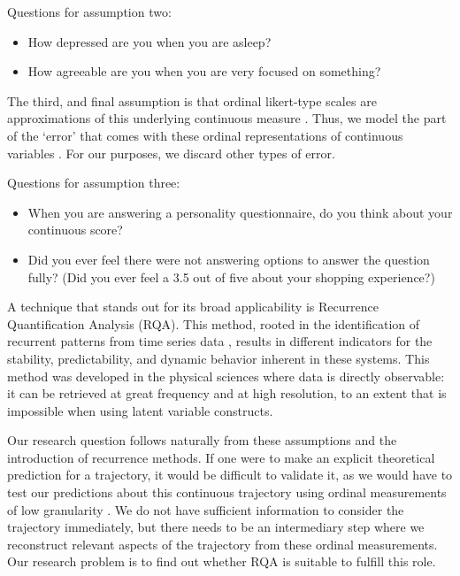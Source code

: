 \documentclass[utf8]{FrontiersinVancouver}
\begin{document}
\begin{framed}
    Questions for assumption two:
    \begin{itemize}
        \item How depressed are you when you are asleep?
        \item How agreeable are you when you are very focused on something?
    \end{itemize}
\end{framed}

The third, and final assumption is that ordinal likert-type scales are approximations of this underlying continuous measure \citep{haslbeckRecoveringWithinpersonDynamics2022}. Thus, we model the part of the `error' that comes with these ordinal representations of continuous variables \citep{westlandInformationLossBias2022}. For our purposes, we discard other types of error.

\begin{framed}
    Questions for assumption three:
    \begin{itemize}
        \item When you are answering a personality questionnaire, do you think about your continuous score?
        \item Did you ever feel there were not answering options to answer the question fully? (Did you ever feel a 3.5 out of five about your shopping experience?)
    \end{itemize}
\end{framed}

A technique that stands out for its broad applicability is Recurrence Quantification Analysis (RQA). This method, rooted in the identification of recurrent patterns from time series data \citep{webber2005recurrence}, results in different indicators for the stability, predictability, and dynamic behavior inherent in these systems. This method was developed in the physical sciences where data is directly observable: it can be retrieved at great frequency and at high resolution, to an extent that is impossible when using latent variable constructs. 

Our research question follows naturally from these assumptions and the introduction of recurrence methods. If one were to make an explicit theoretical prediction for a trajectory, it would be difficult to validate it, as we would have to test our predictions about this continuous trajectory using ordinal measurements of low granularity \citep{haslbeckRecoveringWithinpersonDynamics2022}. We do not have sufficient information to consider the trajectory immediately, but there needs to be an intermediary step where we reconstruct relevant aspects of the trajectory from these ordinal measurements. Our research problem is to find out whether RQA is suitable to fulfill this role.
\end{document}
